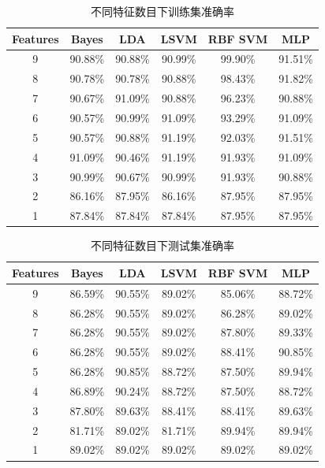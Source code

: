	\begin{table}[htbp]
	\centering
	\begin{tabular}{cccccc}
	\toprule
	Features &   Bayes &     LDA &    LSVM & RBF SVM &     MLP \\
	\midrule
	9 &  90.88\% &  90.88\% &  90.99\% &  99.90\% &  91.51\% \\
	8 &  90.78\% &  90.78\% &  90.88\% &  98.43\% &  91.82\% \\
	7 &  90.67\% &  91.09\% &  90.88\% &  96.23\% &  90.88\% \\
	6 &  90.57\% &  90.99\% &  91.09\% &  93.29\% &  91.09\% \\
	5 &  90.57\% &  90.88\% &  91.19\% &  92.03\% &  91.51\% \\
	4 &  91.09\% &  90.46\% &  91.19\% &  91.93\% &  91.09\% \\
	3 &  90.99\% &  90.67\% &  90.99\% &  91.93\% &  90.88\% \\
	2 &  86.16\% &  87.95\% &  86.16\% &  87.95\% &  87.95\% \\
	1 &  87.84\% &  87.84\% &  87.84\% &  87.95\% &  87.95\% \\
	\bottomrule
	\end{tabular}
	\caption{不同特征数目下训练集准确率}
	\label{tab:nfeaturetrain}
	\end{table}

	\begin{table}[htbp]
	\centering
	\begin{tabular}{cccccc}
	\toprule
	Features &   Bayes &     LDA &    LSVM & RBF SVM &     MLP \\
	\midrule
	9 &  86.59\% &  90.55\% &  89.02\% &  85.06\% &  88.72\% \\
	8 &  86.28\% &  90.55\% &  89.02\% &  86.28\% &  89.02\% \\
	7 &  86.28\% &  90.55\% &  89.02\% &  87.80\% &  89.33\% \\
	6 &  86.28\% &  90.55\% &  89.02\% &  88.41\% &  90.85\% \\
	5 &  86.28\% &  90.85\% &  88.72\% &  87.50\% &  89.94\% \\
	4 &  86.89\% &  90.24\% &  88.72\% &  87.50\% &  88.72\% \\
	3 &  87.80\% &  89.63\% &  88.41\% &  88.41\% &  89.63\% \\
	2 &  81.71\% &  89.02\% &  81.71\% &  89.94\% &  89.94\% \\
	1 &  89.02\% &  89.02\% &  89.02\% &  89.02\% &  89.02\% \\
	\bottomrule
	\end{tabular}
	\caption{不同特征数目下测试集准确率}
	\label{tab:nfeaturetest}
	\end{table}

